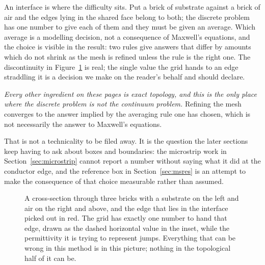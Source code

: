 An interface is where the difficulty sits. Put a brick of substrate against a brick of air and the edges lying in
the shared face belong to both; the discrete problem has one number to give each of them and they must be given
an average. Which average is a modelling decision, not a consequence of Maxwell's equations, and the choice is
visible in the result: two rules give answers that differ by amounts which do not shrink as the mesh is refined
unless the rule is the right one. The discontinuity in Figure~\ref{fig:hiw:interface} is real; the single value
the grid hands to an edge straddling it is a decision we make on the reader's behalf and should declare.

\emph{Every other ingredient on these pages is exact topology, and this is the only place where the discrete
problem is not the continuum problem.} Refining the mesh converges to the answer implied by the averaging rule
one has chosen, which is not necessarily the answer to Maxwell's equations.

That is not a technicality to be filed away. It is the question the later sections keep having to ask about
boxes and boundaries: the microstrip work in Section~\ref{sec:microstrip} cannot report a number without saying
what it did at the conductor edge, and the reference box in Section~\ref{sec:msres} is an attempt to make the
consequence of that choice measurable rather than assumed.

\begin{figure}[htbp]
\centering
{}
\caption{A cross-section through three bricks with a substrate on the left and air on the right and above, and
the edge that lies in the interface picked out in red. The grid has exactly one number to hand that edge, drawn
as the dashed horizontal value in the inset, while the permittivity it is trying to represent jumps. Everything
that can be wrong in this method is in this picture; nothing in the topological half of it can be.}
\label{fig:hiw:interface}
\end{figure}

